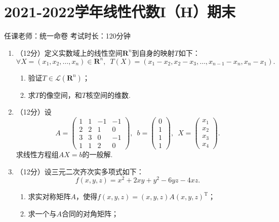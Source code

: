 \section{2021-2022学年线性代数I（H）期末}

\begin{center}
    任课老师：统一命卷\hspace{4em} 考试时长：120分钟
\end{center}

\begin{enumerate}
    \item （12分）定义实数域上的线性空间$\mathbf{R}^n$到自身的映射$T$如下：
    \[\forall X=(x_1,x_2,\ldots,x_n)\in\mathbf{R}^n,\enspace T(X)=(x_1-x_2,x_2-x_3,\ldots,x_{n-1}-x_n,x_n-x_1).\]
    \begin{enumerate}
        \item 验证$T\in\mathcal{L}(\mathbf{R}^n)$；

        \item 求$T$的像空间，和$T$核空间的维数.
    \end{enumerate}

    \item （12分）设
    \[A=\begin{pmatrix}
        1 & 1 & -1 & -1 \\ 2 & 2 & 1 & 0 \\ 3 & 3 & 0 & -1 \\ 1 & 1 & 2 & 0
    \end{pmatrix},\enspace b=\begin{pmatrix}
        0 \\ 1 \\ 1 \\ 1
    \end{pmatrix},\enspace X=\begin{pmatrix}
        x_1 \\ x_2 \\ x_3 \\ x_4
    \end{pmatrix}.\]
    求线性方程组$AX=b$的一般解.

    \item （12分）设三元二次齐次实多项式如下：
    \[f(x,y,z)=x^2+2xy+y^2-6yz-4xz.\]
    \begin{enumerate}
        \item 求实对称矩阵$A$，使得$f(x,y,z)=(x, y, z)A(x, y, z)^\mathrm{T}$；

        \item 求一个与$A$合同的对角矩阵；


\end{enumerate}
\end{enumerate}

